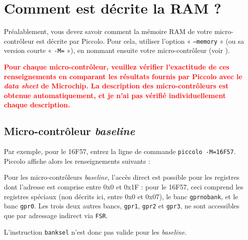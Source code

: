 
\cleardoublepage


\thispagestyle{empty}








\section{Comment est décrite la RAM ?}

Préalablement, vous devez savoir comment la mémoire RAM de votre micro-contrôleur est décrite par Piccolo. Pour cela, utiliser l'option « \texttt{--memory} » (ou sa version courte « \texttt{-M=} »), en nommant ensuite votre micro-contrôleur (voir ).

\textcolor{red}{\bf Pour chaque micro-contrôleur, veuillez vérifier l'exactitude de ces renseignements en comparant les résultats fournis par Piccolo avec le \emph{data sheet} de Microchip. La description des micro-contrôleurs est obtenue automatiquement, et je n'ai pas vérifié individuellement chaque description.}



\subsection{Micro-contrôleur \emph{baseline}}

Par exemple, pour le 16F57, entrez la ligne de commande \texttt{piccolo -M=16F57}. Piccolo affiche alors les renseignements suivants :

{\footnotesize }

Pour les micro-contrôleurs \emph{baseline}, l'accès direct est possible pour les registres dont l'adresse est comprise entre 0x0 et 0x1F : pour le 16F57, ceci comprend les registres spéciaux (non décrits ici, entre 0x0 et 0x07), le banc \texttt{gprnobank}, et le banc \texttt{gpr0}. Les trois deux autres bancs, \texttt{gpr1}, \texttt{gpr2} et \texttt{gpr3}, ne sont accessibles que par adressage indirect via \texttt{FSR}.

L'instruction \texttt{banksel} n'est donc pas valide pour les \emph{baseline}.

